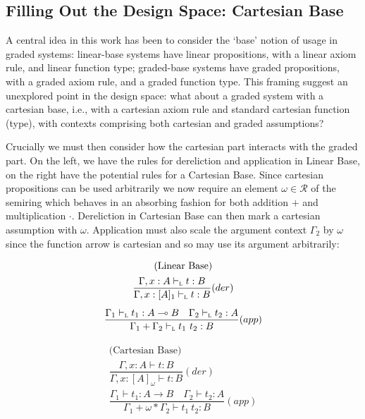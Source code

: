\subsection{Filling Out the Design Space: Cartesian Base}
\label{sec:cartesian-base}

A central idea in this work has been to consider the `base' notion of usage in
graded systems: linear-base systems have linear propositions, with a linear
axiom rule, and linear function type; graded-base systems have graded propositions,
with a graded axiom rule, and a graded function type. This framing suggest
an unexplored point in the design space: what about a graded system with
a cartesian base, i.e., with a cartesian axiom rule and standard cartesian
function (type), with contexts comprising both cartesian and graded
assumptions?

Crucially we must then consider how the cartesian part interacts with
the graded part. On the left, we have the rules for dereliction and
application in Linear Base, on the right have the potential rules
for a Cartesian Base. Since cartesian propositions can be used arbitrarily
we now require an element $\omega \in \mathcal{R}$ of the semiring which
behaves in an absorbing fashion for both addition $+$ and multiplication $\cdot$.
Dereliction in Cartesian Base can then mark a cartesian assumption
with $\omega$. Application must also scale the argument context $\Gamma_2$
by $\omega$ since the function arrow is cartesian and so may use
its argument arbitrarily:

\begin{minipage}{0.5\linewidth}
\begin{align*}
\begin{array}{c}
\text{(Linear Base)} \\[0.5em]
\dfrac{\Gamma, x : A \vdash_{\textsc{l}} t : B}
      {\Gamma, x : [A]_1 \vdash_{\textsc{l}} t : B} (der)
\\[1.5em]
\dfrac{\Gamma_1 \vdash_{\textsc{l}} t_1 : A \multimap B \quad \Gamma_2 \vdash_{\textsc{l}} t_2 : A}
      {\Gamma_1 + \Gamma_2 \vdash_{\textsc{l}} t_1\ t_2 : B}(app)
\end{array}
\\
\end{align*}
\end{minipage}
\begin{minipage}{0.5\linewidth}
\begin{align*}
\begin{array}{c}
\text{(Cartesian Base)} \\[0.5em]
\dfrac{\Gamma, x : A \vdash t : B}
      {\Gamma, x : [A]_\omega \vdash t : B}(der)
\\[1.5em]
\dfrac{\Gamma_1 \vdash t_1 : A \rightarrow B \quad \Gamma_2 \vdash t_2 : A}
      {\Gamma_1 + \omega \ast \Gamma_2 \vdash t_1\ t_2 : B}(app)
\end{array}
\\
\end{align*}
\end{minipage}

